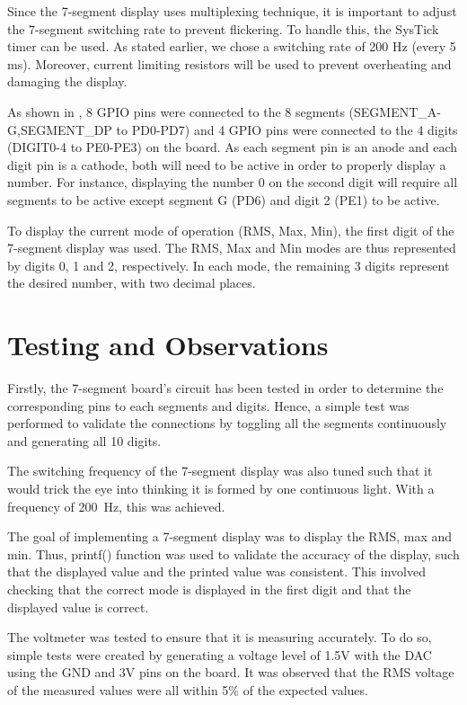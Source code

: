 \documentclass[a4paper,titlepage]{article}
\begin{document}
Since the 7-segment display uses multiplexing technique, it is important to adjust the 7-segment switching rate to prevent flickering. To handle this, the SysTick timer can be used. As stated earlier, we chose a switching rate of 200 Hz (every 5 ms). Moreover, current limiting resistors will be used to prevent overheating and damaging the display.

As shown in , 8 GPIO pins were connected to the 8 segments (SEGMENT\_A-G,SEGMENT\_DP to PD0-PD7) and 4 GPIO pins were connected to the 4 digits (DIGIT0-4 to PE0-PE3) on the board. As each segment pin is an anode and each digit pin is a cathode, both will need to be active in order to properly display a number. For instance, displaying the number 0 on the second digit will require all segments to be active except segment G (PD6) and digit 2 (PE1) to be active.

To display the current mode of operation (RMS, Max, Min), the first digit of the 7-segment display was used. The RMS, Max and Min modes are thus represented by digits 0, 1 and 2, respectively. In each mode, the remaining 3 digits represent the desired number, with two decimal places.

\section{Testing and Observations}
Firstly, the 7-segment board's circuit has been tested in order to determine the corresponding pins to each segments and digits. Hence, a simple test was performed to validate the connections by toggling all the segments continuously and generating all 10 digits.

The switching frequency of the 7-segment display was also tuned such that it would trick the eye into thinking it is formed by one continuous light. With a frequency of \SI{200}{\hertz}, this was achieved.

The goal of implementing a 7-segment display was to display the RMS, max and min. Thus, printf() function was used to validate the accuracy of the display, such that the displayed value and the printed value was consistent. This involved checking that the correct mode is displayed in the first digit and that the displayed value is correct.

The voltmeter was tested to ensure that it is measuring accurately. To do so, simple tests were created by generating a voltage level of 1.5V with the DAC using the GND and 3V pins on the board. It was observed that the RMS voltage of the measured values were all within 5\% of the expected values.
\end{document}
